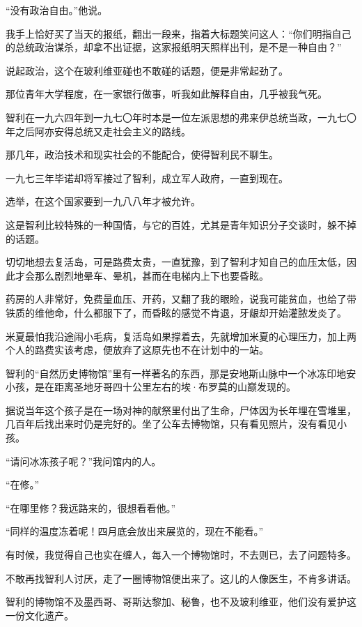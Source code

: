 \par “没有政治自由。”他说。
\par 我手上恰好买了当天的报纸，翻出一段来，指着大标题笑问这人：“你们明指自己的总统政治谋杀，却拿不出证据，这家报纸明天照样出刊，是不是一种自由？”
\par 说起政治，这个在玻利维亚碰也不敢碰的话题，便是非常起劲了。
\par 那位青年大学程度，在一家银行做事，听我如此解释自由，几乎被我气死。
\par 智利在一九六四年到一九七〇年时本是一位左派思想的弗来伊总统当政，一九七〇年之后阿亦安得总统又走社会主义的路线。
\par 那几年，政治技术和现实社会的不能配合，使得智利民不聊生。
\par 一九七三年毕诺却将军接过了智利，成立军人政府，一直到现在。
\par 选举，在这个国家要到一九八八年才被允许。
\par 这是智利比较特殊的一种国情，与它的百姓，尤其是青年知识分子交谈时，躲不掉的话题。
\par 切切地想去复活岛，可是路费太贵，一直犹豫，到了智利才知自己的血压太低，因此才会那么剧烈地晕车、晕机，甚而在电梯内上下也要昏眩。
\par 药房的人非常好，免费量血压、开药，又翻了我的眼睑，说我可能贫血，也给了带铁质的维他命，什么都服下了，而昏眩的感觉不肯退，牙龈却开始灌脓发炎了。
\par 米夏最怕我沿途闹小毛病，复活岛如果撑着去，先就增加米夏的心理压力，加上两个人的路费实该考虑，便放弃了这原先也不在计划中的一站。
\par 智利的“自然历史博物馆”里有一样著名的东西，那是安地斯山脉中一个冰冻印地安小孩，是在距离圣地牙哥四十公里左右的埃·布罗莫的山巅发现的。
\par 据说当年这个孩子是在一场对神的献祭里付出了生命，尸体因为长年埋在雪堆里，几百年后找出来时仍是完好的。坐了公车去博物馆，只有看见照片，没有看见小孩。
\par “请问冰冻孩子呢？”我问馆内的人。
\par “在修。”
\par “在哪里修？我远路来的，很想看看他。”
\par “同样的温度冻着呢！四月底会放出来展览的，现在不能看。”
\par 有时候，我觉得自己也实在缠人，每入一个博物馆时，不去则已，去了问题特多。
\par 不敢再找智利人讨厌，走了一圈博物馆便出来了。这儿的人像医生，不肯多讲话。
\par 智利的博物馆不及墨西哥、哥斯达黎加、秘鲁，也不及玻利维亚，他们没有爱护这一份文化遗产。
